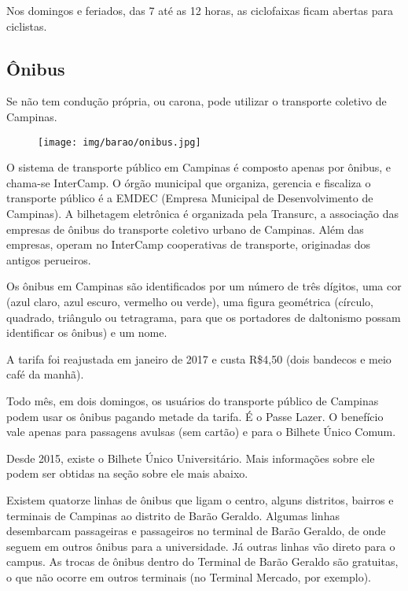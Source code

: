 Nos domingos e feriados, das 7 até as 12 horas, as ciclofaixas ficam abertas
para ciclistas.

\subsection{Ônibus}

Se não tem condução própria, ou carona, pode utilizar o transporte coletivo de
Campinas.

\begin{figure}[h!]  \centering
    \texttt{[image: img/barao/onibus.jpg]}
\end{figure}

O sistema de transporte público em Campinas é composto apenas por ônibus, e
chama-se InterCamp. O órgão municipal que organiza, gerencia e fiscaliza o
transporte público é a EMDEC (Empresa Municipal de Desenvolvimento de
Campinas). A bilhetagem eletrônica é organizada pela Transurc, a associação das
empresas de ônibus do transporte coletivo urbano de Campinas. Além das
empresas, operam no InterCamp cooperativas de transporte, originadas dos
antigos perueiros.

Os ônibus em Campinas são identificados por um número de três dígitos, uma cor
(azul claro, azul escuro, vermelho ou verde), uma figura geométrica (círculo,
quadrado, triângulo ou tetragrama, para que os portadores de daltonismo possam
identificar os ônibus) e um nome.

A tarifa foi reajustada em janeiro de 2017 e custa R\$4,50 (dois bandecos e
meio café da manhã).

Todo mês, em dois domingos, os usuários do transporte público de Campinas podem
usar os ônibus pagando metade da tarifa. É o Passe Lazer. O benefício vale
apenas para passagens avulsas (sem cartão) e para o Bilhete Único Comum.

Desde 2015, existe o Bilhete Único Universitário. Mais informações sobre ele
podem ser obtidas na seção sobre ele mais abaixo.

Existem quatorze linhas de ônibus que ligam o centro, alguns distritos, bairros
e terminais de Campinas ao distrito de Barão Geraldo. Algumas linhas
desembarcam passageiras e passageiros no terminal de Barão Geraldo, de onde
seguem em outros ônibus para a universidade. Já outras linhas vão direto para o
campus. As trocas de ônibus dentro do Terminal de Barão Geraldo são gratuitas,
o que não ocorre em outros terminais (no Terminal Mercado, por exemplo).

